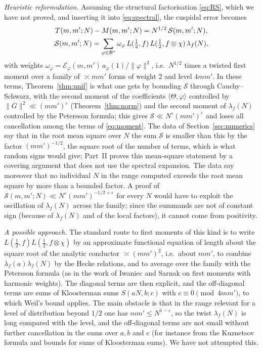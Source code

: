 \documentclass[11pt]{amsart}
\theoremstyle{remark}
\newcommand{\e}{\varepsilon}
\begin{document}
\emph{Heuristic reformulation.} Assuming the structural factorisation \eqref{eq:RS}, which we have not proved, and inserting it into \eqref{eq:spectral}, the cuspidal error becomes
\begin{gather}
T(m,m';N)-M(m,m';N)=N^{1/2}\,\mathcal S(m,m';N),\notag\\
\mathcal S(m,m';N)=\sum_{\varphi\in\mathcal B^*}\omega_\varphi\,L(\tfrac12,f)\,L(\tfrac12,f\otimes\chi)\,\lambda_f(N),\label{eq:moment}
\end{gather}
with weights $\omega_\varphi=\mathcal E_\varphi(m,m')\,a_\varphi(1)/\|\varphi\|^2$, i.e.\ $N^{1/2}$ times a twisted first moment over a family of $\asymp mm'$ forms of weight $2$ and level $4mm'$. In these terms, Theorem~\ref{thm:unif} is what one gets by bounding $\mathcal S$ through Cauchy--Schwarz, with the second moment of the coefficients $\langle\Theta,\varphi\rangle$ controlled by $\|G\|^2\ll(mm')^\e$ (Theorem~\ref{thm:norm}) and the second moment of $\lambda_f(N)$ controlled by the Petersson formula; this gives $\mathcal S\ll N^\e(mm')^\e$ and loses all cancellation among the terms of \eqref{eq:moment}. The data of Section~\ref{sec:numerics} say that in the root mean square over $N$ the sum $\mathcal S$ is smaller than this by the factor $(mm')^{-1/2}$, the square root of the number of terms, which is what random signs would give; Part~II proves this mean-square statement \cite[Theorem~1.2]{ChenII} by a covering argument that does not use the spectral expansion. The data say moreover that no individual $N$ in the range computed exceeds the root mean square by more than a bounded factor. A proof of $\mathcal S(m,m';N)\ll N^\e(mm')^{-1/2+\e}$ for every $N$ would have to exploit the oscillation of $\lambda_f(N)$ across the family; since the summands are not of constant sign (because of $\lambda_f(N)$ and of the local factors), it cannot come from positivity.

\emph{A possible approach.} The standard route to first moments of this kind is to write $L(\frac12,f)L(\frac12,f\otimes\chi)$ by an approximate functional equation of length about the square root of the analytic conductor $\asymp(mm')^2$, i.e.\ about $mm'$, to combine $\lambda_f(a)\lambda_f(N)$ by the Hecke relations, and to average over the family with the Petersson formula (as in the work of Iwaniec and Sarnak \cite{IwaniecSarnak} on first moments with harmonic weights). The diagonal terms are then explicit, and the off-diagonal terms are sums of Kloosterman sums $S(aN,b;c)$ with $c\equiv0\pmod{4mm'}$, to which Weil's bound applies. The main obstacle is that in the range relevant for a level of distribution beyond $1/2$ one has $mm'\le N^{1-\e}$, so the twist $\lambda_f(N)$ is long compared with the level, and the off-diagonal terms are not small without further cancellation in the sums over $a,b$ and $c$ (for instance from the Kuznetsov formula and bounds for sums of Kloosterman sums). We have not attempted this.
\end{document}
